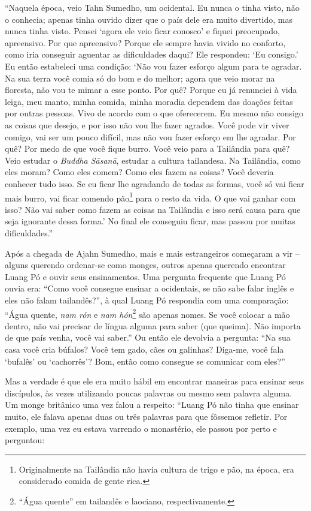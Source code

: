 ``Naquela época, veio Tahn Sumedho, um ocidental. Eu nunca o tinha
visto, não o conhecia; apenas tinha ouvido dizer que o país dele era
muito divertido, mas nunca tinha visto. Pensei `agora ele veio ficar
conosco' e fiquei preocupado, apreensivo. Por que apreensivo? Porque ele
sempre havia vivido no conforto, como iria conseguir aguentar as
dificuldades daqui? Ele respondeu: `Eu consigo.' Eu então estabeleci uma
condição: `Não vou fazer esforço algum para te agradar. Na sua terra
você comia só do bom e do melhor; agora que veio morar na floresta, não
vou te mimar a esse ponto. Por quê? Porque eu já renunciei à vida leiga,
meu manto, minha comida, minha moradia dependem das doações feitas por
outras pessoas. Vivo de acordo com o que oferecerem. Eu mesmo não
consigo as coisas que desejo, e por isso não vou lhe fazer agrados. Você
pode vir viver comigo, vai ser um pouco difícil, mas não vou fazer
esforço em lhe agradar. Por quê? Por medo de que você fique burro. Você
veio para a Tailândia para quê? Veio estudar o \emph{Buddha Sāsanā},
estudar a cultura tailandesa. Na Tailândia, como eles moram? Como eles
comem? Como eles fazem as coisas? Você deveria conhecer tudo isso. Se eu
ficar lhe agradando de todas as formas, você só vai ficar mais burro,
vai ficar comendo pão\footnote{Originalmente na Tailândia não havia
  cultura de trigo e pão, na época, era considerado comida de gente
  rica.} para o resto da vida. O que vai ganhar com isso? Não vai saber
como fazem as coisas na Tailândia e isso será causa para que seja
ignorante dessa forma.' No final ele conseguiu ficar, mas passou por
muitas dificuldades.''

Após a chegada de Ajahn Sumedho, mais e mais estrangeiros começaram a
vir -- alguns querendo ordenar-se como monges, outros apenas querendo
encontrar Luang Pó e ouvir seus ensinamentos. Uma pergunta frequente que
Luang Pó ouvia era: ``Como você consegue ensinar a ocidentais, se não
sabe falar inglês e eles não falam tailandês?'', à qual Luang Pó
respondia com uma comparação: ``Água quente, \emph{nam rón} e \emph{nam
hón}\footnote{``Água quente'' em tailandês e laociano, respectivamente.}
são apenas nomes. Se você colocar a mão dentro, não vai precisar de
língua alguma para saber (que queima). Não importa de que país venha,
você vai saber.'' Ou então ele devolvia a pergunta: ``Na sua casa você
cria búfalos? Você tem gado, cães ou galinhas? Diga-me, você fala
`bufalês' ou `cachorrês'? Bom, então como consegue se comunicar com
eles?''

Mas a verdade é que ele era muito hábil em encontrar maneiras para
ensinar seus discípulos, às vezes utilizando poucas palavras ou mesmo
sem palavra alguma. Um monge britânico uma vez falou a respeito: ``Luang
Pó não tinha que ensinar muito, ele falava apenas duas ou três palavras
para que fôssemos refletir. Por exemplo, uma vez eu estava varrendo o
monastério, ele passou por perto e perguntou:

